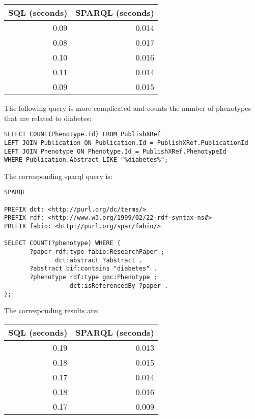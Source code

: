 \begin{center}
\begin{tabular}{rr}
SQL (seconds) & SPARQL (seconds)\\[0pt]
\toprule
0.09 & 0.014\\[0pt]
0.08 & 0.017\\[0pt]
0.10 & 0.016\\[0pt]
0.11 & 0.014\\[0pt]
0.09 & 0.015\\[0pt]
\end{tabular}
\end{center}

The following query is more complicated and counts the number of phenotypes that are related to diabetes:


\begin{Verbatim}[frame=single]
SELECT COUNT(Phenotype.Id) FROM PublishXRef
LEFT JOIN Publication ON Publication.Id = PublishXRef.PublicationId
LEFT JOIN Phenotype ON Phenotype.Id = PublishXRef.PhenotypeId
WHERE Publication.Abstract LIKE "%diabetes%";
\end{Verbatim}

The corresponding sparql query is:

\begin{Verbatim}[frame=single]
SPARQL

PREFIX dct: <http://purl.org/dc/terms/>
PREFIX rdf: <http://www.w3.org/1999/02/22-rdf-syntax-ns#>
PREFIX fabio: <http://purl.org/spar/fabio/>

SELECT COUNT(?phenotype) WHERE {
       ?paper rdf:type fabio:ResearchPaper ;
              dct:abstract ?abstract .
       ?abstract bif:contains "diabetes" .
       ?phenotype rdf:type gnc:Phenotype ;
                  dct:isReferencedBy ?paper .
};  
\end{Verbatim}

The corresponding results are:

\begin{center}
\begin{tabular}{rr}
SQL (seconds) & SPARQL (seconds)\\[0pt]
\toprule
0.19 & 0.013\\[0pt]
0.18 & 0.015\\[0pt]
0.17 & 0.014\\[0pt]
0.18 & 0.016\\[0pt]
0.17 & 0.009\\[0pt]
\end{tabular}
\end{center}

